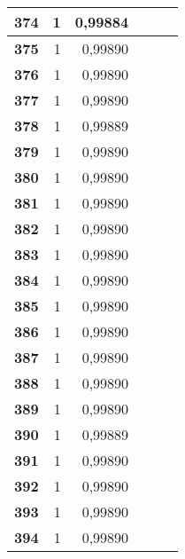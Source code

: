 \begin{longtable}{|r|r|r|l|r|r|}
\textbf{374} & 1 & 0,99884 &  & \multicolumn{1}{l|}{} & \multicolumn{1}{l|}{} \\ \hline
\textbf{375} & 1 & 0,99890 &  & \multicolumn{1}{l|}{} & \multicolumn{1}{l|}{} \\ \hline
\textbf{376} & 1 & 0,99890 &  & \multicolumn{1}{l|}{} & \multicolumn{1}{l|}{} \\ \hline
\textbf{377} & 1 & 0,99890 &  & \multicolumn{1}{l|}{} & \multicolumn{1}{l|}{} \\ \hline
\textbf{378} & 1 & 0,99889 &  & \multicolumn{1}{l|}{} & \multicolumn{1}{l|}{} \\ \hline
\textbf{379} & 1 & 0,99890 &  & \multicolumn{1}{l|}{} & \multicolumn{1}{l|}{} \\ \hline
\textbf{380} & 1 & 0,99890 &  & \multicolumn{1}{l|}{} & \multicolumn{1}{l|}{} \\ \hline
\textbf{381} & 1 & 0,99890 &  & \multicolumn{1}{l|}{} & \multicolumn{1}{l|}{} \\ \hline
\textbf{382} & 1 & 0,99890 &  & \multicolumn{1}{l|}{} & \multicolumn{1}{l|}{} \\ \hline
\textbf{383} & 1 & 0,99890 &  & \multicolumn{1}{l|}{} & \multicolumn{1}{l|}{} \\ \hline
\textbf{384} & 1 & 0,99890 &  & \multicolumn{1}{l|}{} & \multicolumn{1}{l|}{} \\ \hline
\textbf{385} & 1 & 0,99890 &  & \multicolumn{1}{l|}{} & \multicolumn{1}{l|}{} \\ \hline
\textbf{386} & 1 & 0,99890 &  & \multicolumn{1}{l|}{} & \multicolumn{1}{l|}{} \\ \hline
\textbf{387} & 1 & 0,99890 &  & \multicolumn{1}{l|}{} & \multicolumn{1}{l|}{} \\ \hline
\textbf{388} & 1 & 0,99890 &  & \multicolumn{1}{l|}{} & \multicolumn{1}{l|}{} \\ \hline
\textbf{389} & 1 & 0,99890 &  & \multicolumn{1}{l|}{} & \multicolumn{1}{l|}{} \\ \hline
\textbf{390} & 1 & 0,99889 &  & \multicolumn{1}{l|}{} & \multicolumn{1}{l|}{} \\ \hline
\textbf{391} & 1 & 0,99890 &  & \multicolumn{1}{l|}{} & \multicolumn{1}{l|}{} \\ \hline
\textbf{392} & 1 & 0,99890 &  & \multicolumn{1}{l|}{} & \multicolumn{1}{l|}{} \\ \hline
\textbf{393} & 1 & 0,99890 &  & \multicolumn{1}{l|}{} & \multicolumn{1}{l|}{} \\ \hline
\textbf{394} & 1 & 0,99890 &  & \multicolumn{1}{l|}{} & \multicolumn{1}{l|}{} \\ \hline

\end{longtable}
